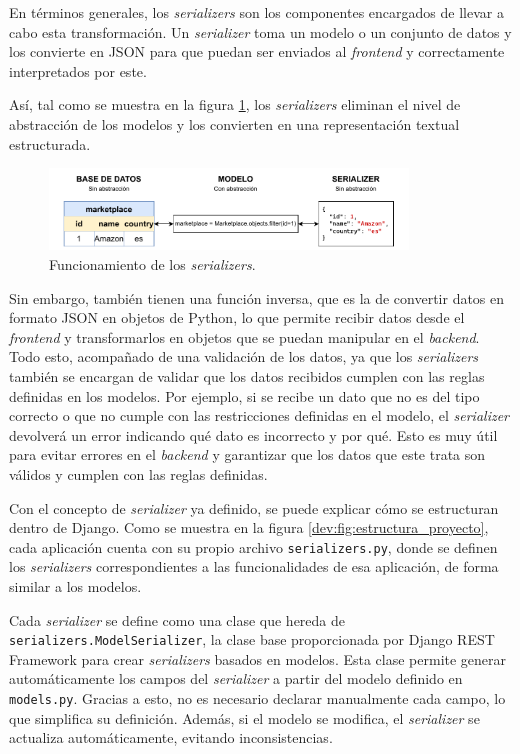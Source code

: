 En términos generales, los \textit{serializers} son los componentes encargados de llevar a cabo esta transformación. Un \textit{serializer} toma un modelo o un conjunto de datos y los convierte en JSON para que puedan ser enviados al \textit{frontend} y correctamente interpretados por este.

Así, tal como se muestra en la figura \ref{dev:fig:serializer}, los \textit{serializers} eliminan el nivel de abstracción de los modelos y los convierten en una representación textual estructurada.

\begin{figure}[H]
    \centering
    \includegraphics[width=0.85\textwidth]{figures/design_develop/serializers.pdf}
    \caption{Funcionamiento de los \textit{serializers}.}
    \label{dev:fig:serializer}
\end{figure}

Sin embargo, también tienen una función inversa, que es la de convertir datos en formato JSON en objetos de Python, lo que permite recibir datos desde el \textit{frontend} y transformarlos en objetos que se puedan manipular en el \textit{backend}. Todo esto, acompañado de una validación de los datos, ya que los \textit{serializers} también se encargan de validar que los datos recibidos cumplen con las reglas definidas en los modelos. Por ejemplo, si se recibe un dato que no es del tipo correcto o que no cumple con las restricciones definidas en el modelo, el \textit{serializer} devolverá un error indicando qué dato es incorrecto y por qué. Esto es muy útil para evitar errores en el \textit{backend} y garantizar que los datos que este trata son válidos y cumplen con las reglas definidas.

Con el concepto de \textit{serializer} ya definido, se puede explicar cómo se estructuran dentro de Django. Como se muestra en la figura \ref{dev:fig:estructura_proyecto}, cada aplicación cuenta con su propio archivo \texttt{serializers.py}, donde se definen los \textit{serializers} correspondientes a las funcionalidades de esa aplicación, de forma similar a los modelos.

Cada \textit{serializer} se define como una clase que hereda de \texttt{serializers.ModelSerializer}, la clase base proporcionada por Django REST Framework para crear \textit{serializers} basados en modelos. Esta clase permite generar automáticamente los campos del \textit{serializer} a partir del modelo definido en \texttt{models.py}. Gracias a esto, no es necesario declarar manualmente cada campo, lo que simplifica su definición. Además, si el modelo se modifica, el \textit{serializer} se actualiza automáticamente, evitando inconsistencias.

